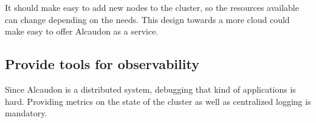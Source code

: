 It should make easy to add new nodes to the cluster, so the resources available
can change depending on the needs. This design towards a more cloud could make
easy to offer Alcaudon as a service.

\subsection{Provide tools for observability}

Since Alcaudon is a distributed system, debugging that kind of applications is
hard. Providing metrics on the state of the cluster as well as centralized logging
is mandatory.
